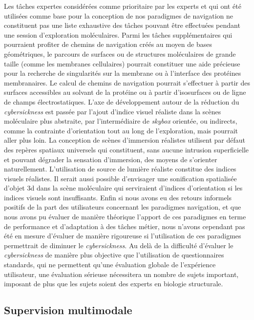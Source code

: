 Les tâches expertes considérées comme prioritaire par les experts et qui ont été utilisées comme base pour la conception de nos paradigmes de navigation ne constituent pas une liste exhaustive des tâches pouvant être effectuées pendant une session d'exploration moléculaires. Parmi les tâches supplémentaires qui pourraient profiter de chemins de navigation créés au moyen de bases géométriques, le parcours de surfaces ou de structures moléculaires de grande taille (comme les membranes cellulaires) pourrait constituer une aide précieuse pour la recherche de singularités sur la membrane ou à l'interface des protéines membranaires. Le calcul de chemins de navigation pourrait s'effectuer à partir des surfaces accessibles au solvant de la protéine ou à partir d'isosurfaces ou de ligne de champs électrostatiques. 
L'axe de développement autour de la réduction du \textit{cybersickness} est passée par l'ajout  d'indice visuel réaliste dans la scènes moléculaire plus abstraite, par l'intermédiaire de \textit{skybox} orientée, ou indirects, comme la contrainte d'orientation tout au long de l'exploration, mais pourrait aller plus loin. La conception de scènes d'immersion réalistes utilisent par défaut des repères spatiaux universels qui constituent, sans aucune intrusion superficielle et pouvant dégrader la sensation d'immersion, des moyens de s'orienter naturellement. L'utilisation de source de lumière réaliste constitue des indices visuels réalistes. Il serait aussi possible d'envisager une sonification spatialisée d'objet 3d dans la scène moléculaire qui serviraient d'indices d'orientation si les indices visuels sont insuffisants. Enfin si nous avons eu des retours informels positifs de la part des utilisateurs concernant les paradigmes navigation, et que nous avons pu évaluer de manière théorique l'apport de ces paradigmes en terme de performance et d'adaptation à des tâches métier, nous n'avons cependant pas été en mesure d'évaluer de manière rigoureuse si l'utilisation de ces paradigmes permettrait de diminuer le \textit{cybersickness}. Au delà de la difficulté d'évaluer le \emph{cybersickness} de manière plus objective que l'utilisation de questionnaires standards, qui ne permettent qu'une évaluation globale de l'expérience utilisateur, une évaluation sérieuse nécessitera un nombre de sujets important, imposant de plus que les sujets soient des experts en biologie structurale.

\subsection*{Supervision multimodale}

